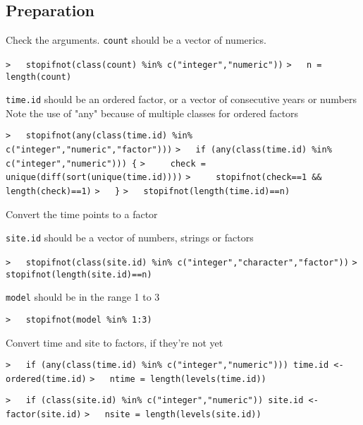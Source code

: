 \documentclass[a4paper]{article}
\begin{document}
\subsection{Preparation}
Check the arguments. \verb!count! should be a vector of numerics.\par
\verb~>   stopifnot(class(count) %in% c("integer","numeric"))~\newline
\verb~>   n = length(count)~\par

\verb!time.id! should be an ordered factor, or a vector of consecutive years or numbers
Note the use of "any" because of multiple classes for ordered factors\par
\verb~>   stopifnot(any(class(time.id) %in% c("integer","numeric","factor")))~\newline
\verb~>   if (any(class(time.id) %in% c("integer","numeric"))) {~\newline
\verb~>     check = unique(diff(sort(unique(time.id))))~\newline
\verb~>     stopifnot(check==1 && length(check)==1)~\newline
\verb~>   }~\newline
\verb~>   stopifnot(length(time.id)==n)~\par
Convert the time points to a factor\par

\verb!site.id! should be a vector of numbers, strings or factors\par
\verb~>   stopifnot(class(site.id) %in% c("integer","character","factor"))~\newline
\verb~>   stopifnot(length(site.id)==n)~\par

\verb!model! should be in the range 1 to 3\par
\verb~>   stopifnot(model %in% 1:3)~\par

Convert time and site to factors, if they're not yet\par
\verb~>   if (any(class(time.id) %in% c("integer","numeric"))) time.id <- ordered(time.id)~\newline
\verb~>   ntime = length(levels(time.id))~\par

\verb~>   if (class(site.id) %in% c("integer","numeric")) site.id <- factor(site.id)~\newline
\verb~>   nsite = length(levels(site.id))~\par
\end{document}
